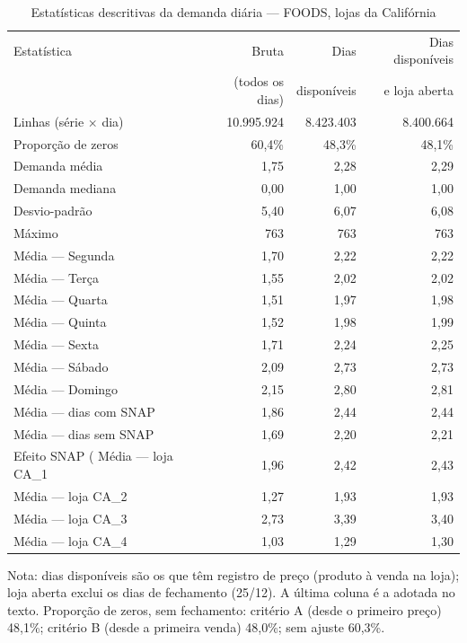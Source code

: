 \begin{table}[htbp]
\centering
\caption{Estatísticas descritivas da demanda diária — FOODS, lojas da Califórnia}
\label{tab:descritivas}
\begin{tabular}{lrrr}
\toprule
Estatística & Bruta & Dias & Dias disponíveis \\
 & (todos os dias) & disponíveis & e loja aberta \\
\midrule
Linhas (série × dia) & 10.995.924 & 8.423.403 & 8.400.664 \\
Proporção de zeros & 60,4\% & 48,3\% & 48,1\% \\
Demanda média & 1,75 & 2,28 & 2,29 \\
Demanda mediana & 0,00 & 1,00 & 1,00 \\
Desvio-padrão & 5,40 & 6,07 & 6,08 \\
Máximo & 763 & 763 & 763 \\
\addlinespace
Média — Segunda & 1,70 & 2,22 & 2,22 \\
Média — Terça & 1,55 & 2,02 & 2,02 \\
Média — Quarta & 1,51 & 1,97 & 1,98 \\
Média — Quinta & 1,52 & 1,98 & 1,99 \\
Média — Sexta & 1,71 & 2,24 & 2,25 \\
Média — Sábado & 2,09 & 2,73 & 2,73 \\
Média — Domingo & 2,15 & 2,80 & 2,81 \\
\addlinespace
Média — dias com SNAP & 1,86 & 2,44 & 2,44 \\
Média — dias sem SNAP & 1,69 & 2,20 & 2,21 \\
Efeito SNAP (%
\addlinespace
Média — loja CA\_1 & 1,96 & 2,42 & 2,43 \\
Média — loja CA\_2 & 1,27 & 1,93 & 1,93 \\
Média — loja CA\_3 & 2,73 & 3,39 & 3,40 \\
Média — loja CA\_4 & 1,03 & 1,29 & 1,30 \\
\bottomrule
\end{tabular}
\par\smallskip
{\footnotesize Nota: dias disponíveis são os que têm registro de preço (produto à venda na loja); loja aberta exclui os dias de fechamento (25/12). A última coluna é a adotada no texto. Proporção de zeros, sem fechamento: critério A (desde o primeiro preço) 48,1\%; critério B (desde a primeira venda) 48,0\%; sem ajuste 60,3\%.}
\end{table}
